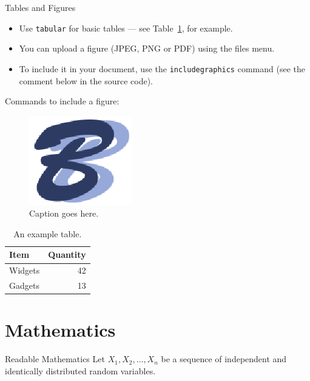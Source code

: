 \documentclass{beamer}
\begin{document}
\begin{frame}{Tables and Figures}

\begin{itemize}
\item Use \texttt{tabular} for basic tables --- see Table~\ref{tab:widgets}, for example.
\item You can upload a figure (JPEG, PNG or PDF) using the files menu.
\item To include it in your document, use the \texttt{includegraphics} command (see the comment below in the source code).
\end{itemize}

 Commands to include a figure:
\begin{figure}
 \includegraphics[width=.1\textwidth]{logo.eps}
 \caption{\label{fig:your-figure}Caption goes here.}
\end{figure}

\begin{table}
\centering
\begin{tabular}{l|r}
Item & Quantity \\\hline
Widgets & 42 \\
Gadgets & 13
\end{tabular}
\caption{\label{tab:widgets}An example table.}
\end{table}

\end{frame}

\section{Mathematics}

\begin{frame}{Readable Mathematics}
Let $X_1, X_2, \ldots, X_n$ be a sequence of independent and identically distributed random variables.
\end{frame}
\end{document}
